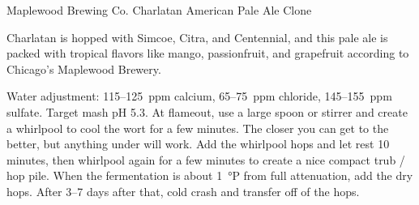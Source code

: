 \begin{recipie}{Maplewood Brewing Co. Charlatan American Pale Ale Clone}

\begin{aboutblock}
Charlatan is hopped with Simcoe, Citra, and Centennial, and this pale ale is
packed with tropical flavors like mango, passionfruit, and grapefruit according
to Chicago's Maplewood Brewery. \sourceaha
\end{aboutblock}


\begin{methodandtiming}
 
\begin{mashsteps}
\end{mashsteps}

\begin{directions}
Water adjustment: 115--125~ppm calcium, 65--75~ppm chloride, 145--155~ppm
sulfate. Target mash pH 5.3. At flameout, use a large spoon or stirrer and
create a whirlpool to cool the wort for a few minutes. The closer you can get
to  the better, but anything under  will work. Add the
whirlpool hops and let rest 10 minutes, then whirlpool again for a few minutes
to create a nice compact trub / hop pile. When the fermentation is about 1~°P
from full attenuation, add the dry hops. After 3--7 days after that,
cold crash and transfer off of the hops.
\end{directions}

\end{methodandtiming}

\pagebreak

\begin{ingredientsblock}

\begin{malts}
\end{malts}

\begin{hops}
\end{hops}


\end{ingredientsblock}
\end{recipie}
